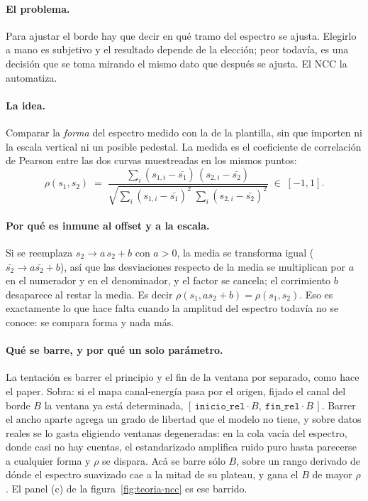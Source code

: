 \documentclass[11pt,a4paper]{article}
\begin{document}
\paragraph{El problema.} Para ajustar el borde hay que decir en qué tramo del
espectro se ajusta. Elegirlo a mano es subjetivo y el resultado depende de la
elección; peor todavía, es una decisión que se toma mirando el mismo dato que
después se ajusta. El NCC la automatiza.

\paragraph{La idea.} Comparar la \emph{forma} del espectro medido con la de la
plantilla, sin que importen ni la escala vertical ni un posible pedestal. La
medida es el coeficiente de correlación de Pearson entre las dos curvas
muestreadas en los mismos puntos:
\[
   \rho(s_1, s_2) \;=\;
   \frac{\sum_i (s_{1,i}-\bar{s_1})\,(s_{2,i}-\bar{s_2})}
        {\sqrt{\sum_i (s_{1,i}-\bar{s_1})^2 \;\sum_i (s_{2,i}-\bar{s_2})^2}}
   \;\in\; [-1, 1].
\]

\paragraph{Por qué es inmune al offset y a la escala.} Si se reemplaza
$s_2 \to a\,s_2 + b$ con $a>0$, la media se transforma igual
($\bar{s_2} \to a\bar{s_2}+b$), así que las desviaciones respecto de la media
se multiplican por $a$ en el numerador y en el denominador, y el factor se
cancela; el corrimiento $b$ desaparece al restar la media. Es decir
$\rho(s_1, a s_2 + b) = \rho(s_1, s_2)$. Eso es exactamente lo que hace falta
cuando la amplitud del espectro todavía no se conoce: se compara forma y nada
más.

\paragraph{Qué se barre, y por qué un solo parámetro.} La tentación es barrer
el principio y el fin de la ventana por separado, como hace el paper. Sobra:
si el mapa canal-energía pasa por el origen, fijado el canal del borde $B$ la
ventana ya está determinada,
$[\,\texttt{inicio\_rel}\cdot B,\ \texttt{fin\_rel}\cdot B\,]$. Barrer el ancho
aparte agrega un grado de libertad que el modelo no tiene, y sobre datos reales
se lo gasta eligiendo ventanas degeneradas: en la cola vacía del espectro, donde
casi no hay cuentas, el estandarizado amplifica ruido puro hasta parecerse a
cualquier forma y $\rho$ se dispara. Acá se barre sólo $B$, sobre un rango
derivado de dónde el espectro suavizado cae a la mitad de su plateau, y gana el
$B$ de mayor $\rho$. El panel (c) de la figura~\ref{fig:teoria-ncc} es ese
barrido.
\end{document}
